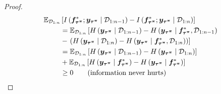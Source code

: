 \begin{proof}
\begin{align*}
    \mathbb{E}_{{\mathcal{D}}_{1:n}}&\left[I\left({\bm{f}}^*_{{\bm{\tau}}^{{\bm{\pi}}}}; {\bm{y}}_{{\bm{\tau}}^{{\bm{\pi}}}} \mid {\mathcal{D}}_{1:n-1}\right)  - I\left({\bm{f}}^*_{{\bm{\tau}}^{{\bm{\pi}}}}; {\bm{y}}_{{\bm{\tau}}^{{\bm{\pi}}}} \mid {\mathcal{D}}_{1:n}\right)\right] \\
    &= 
    \mathbb{E}_{{\mathcal{D}}_{1:n}}\left[H\left({\bm{y}}_{{\bm{\tau}}^{{\bm{\pi}}}} \mid {\mathcal{D}}_{1:n-1}\right) - H\left({\bm{y}}_{{\bm{\tau}}^{{\bm{\pi}}}} \mid {\bm{f}}^*_{{\bm{\tau}}^{{\bm{\pi}}}}, {\mathcal{D}}_{1:n-1}\right)\right. \\
    &- \left. \left(
     H\left({\bm{y}}_{{\bm{\tau}}^{{\bm{\pi}}}} \mid {\mathcal{D}}_{1:n}\right)
     - H\left({\bm{y}}_{{\bm{\tau}}^{{\bm{\pi}}}} \mid {\bm{f}}^*_{{\bm{\tau}}^{{\bm{\pi}}}},  {\mathcal{D}}_{1:n}\right) \right) \right] \\
    &= \mathbb{E}_{{\mathcal{D}}_{1:n}}\left[H\left({\bm{y}}_{{\bm{\tau}}^{{\bm{\pi}}}} \mid {\mathcal{D}}_{1:n-1}\right) - H\left({\bm{y}}_{{\bm{\tau}}^{{\bm{\pi}}}} \mid {\mathcal{D}}_{1:n}\right)\right] \\
    &+ \mathbb{E}_{{\mathcal{D}}_{1:n}}\left[H\left({\bm{y}}_{{\bm{\tau}}^{{\bm{\pi}}}} \mid {\bm{f}}^*_{{\bm{\tau}}^{{\bm{\pi}}}}\right) - H\left({\bm{y}}_{{\bm{\tau}}^{{\bm{\pi}}}} \mid {\bm{f}}^*_{{\bm{\tau}}^{{\bm{\pi}}}}\right)\right] \\
    &\geq 0 \tag{information never hurts}
\end{align*}


\end{proof}
